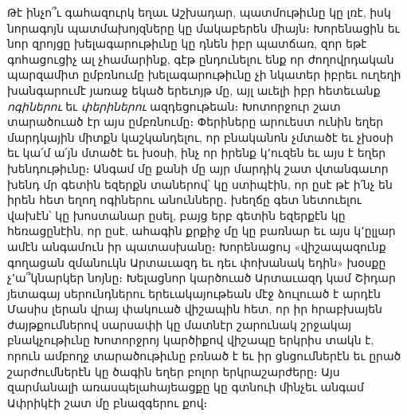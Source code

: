 \documentclass{article}
\begin{document}
{Թէ ինչո՞ւ գահազուրկ եղաւ Աշխադար, պատմութիւնը կը լռէ, իսկ նորագոյն պատմախոյզները կը մակաբերեն միայն։ Խորենացին եւ նոր զրոյցը խելագարութիւնը կը դնեն իբր պատճառ, զոր եթէ գոհացուցիչ ալ չհամարինք, գէթ ընդունելու ենք որ ժողովրդական պարզամիտ ըմբռնումը խելագարութիւնը չի նկատեր իբրեւ ուղեղի խանգարումէ յառաջ եկած երեւոյթ մը, այլ աւելի իբր հետեւանք \emph{ոգիներու} եւ \emph{փերիներու} ազդեցութեան։ Խոտորջուր շատ տարածուած էր այս ըմբռնումը։ Փերիները արուեստ ունին եղեր մարդկային միտքն կաշկանդելու, որ բնականոն չմտածէ եւ չխօսի եւ կա՛մ ա՛յն մտածէ եւ խօսի, ինչ որ իրենք կ՚ուզեն եւ այս է եղեր խենդութիւնը։ Անգամ մը քանի մը այր մարդիկ շատ վտանգաւոր խենդ մր գետին եզերքն տաներով՝ կը ստիպէին, որ ըսէ թէ ի՛նչ են իրեն հետ եղող ոգիներու անունները․ խեղճը գետ նետուելու վախէն՝ կը խոստանար ըսել, բայց երբ գետին եզերքէն կը հեռացընէին, որ ըսէ, ահագին քրքիջ մը կը բառնար եւ այս կ՚ըլլար ամէն անգամուն իր պատասխանը։ Խորենացույ «վիշապազունք գողացան զմանուկն Արտաւազդ եւ դեւ փոխանակ եդին» խօսքը չ՚ա՞կնարկեր նոյնը։ Խելացնոր կարծուած Արտաւազդ կամ Շիդար յետագայ սերունդներու երեւակայութեան մէջ ձուլուած է արդէն Մասիս լերան վրայ փակուած վիշապին հետ, որ իր հրաբխայեն ժայթքումներով սարսափի կը մատնէր շարունակ շրջակայ բնակչութիւնը Խոտորջրոյ կարծիքով վիշապը երկրիս տակն է, որուն ամբողջ տարածութիւնը բռնած է եւ իր ցնցումներէն եւ ըրած շարժումներէն կը ծագին եղեր բոլոր երկրաշարժերը։ Այս զարմանալի առասպելահայեացքը կը գտնուի մինչեւ անգամ Ափրիկէի շատ մը բնազգերու քով։

}
\end{document}
